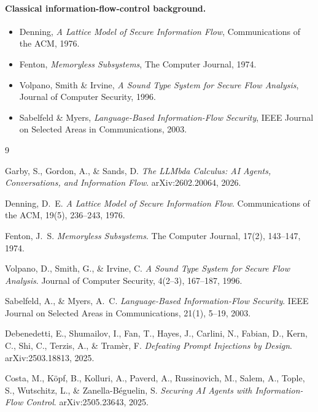 \documentclass[11pt, a4paper]{article}
\begin{document}
\begin{descirption}
{\paragraph{Classical information-flow-control background.}
\begin{itemize}
  \item Denning, \emph{A Lattice Model of Secure Information Flow},
    Communications of the ACM, 1976.
  \item Fenton, \emph{Memoryless Subsystems}, The Computer Journal, 1974.
  \item Volpano, Smith \& Irvine, \emph{A Sound Type System for Secure
    Flow Analysis}, Journal of Computer Security, 1996.
  \item Sabelfeld \& Myers, \emph{Language-Based Information-Flow
    Security}, IEEE Journal on Selected Areas in Communications, 2003.
\end{itemize}

\begin{thebibliography}{9}

Garby, S., Gordon, A., \& Sands, D.
\newblock \emph{The LLMbda Calculus: AI Agents, Conversations, and
Information Flow}.
\newblock arXiv:2602.20064, 2026.

Denning, D.~E.
\newblock \emph{A Lattice Model of Secure Information Flow}.
\newblock Communications of the ACM, 19(5), 236--243, 1976.

Fenton, J.~S.
\newblock \emph{Memoryless Subsystems}.
\newblock The Computer Journal, 17(2), 143--147, 1974.

Volpano, D., Smith, G., \& Irvine, C.
\newblock \emph{A Sound Type System for Secure Flow Analysis}.
\newblock Journal of Computer Security, 4(2--3), 167--187, 1996.

Sabelfeld, A., \& Myers, A.~C.
\newblock \emph{Language-Based Information-Flow Security}.
\newblock IEEE Journal on Selected Areas in Communications, 21(1), 5--19, 2003.

Debenedetti, E., Shumailov, I., Fan, T., Hayes, J., Carlini, N., Fabian,
D., Kern, C., Shi, C., Terzis, A., \& Tram\`er, F.
\newblock \emph{Defeating Prompt Injections by Design}.
\newblock arXiv:2503.18813, 2025.

Costa, M., K\"opf, B., Kolluri, A., Paverd, A., Russinovich, M., Salem,
A., Tople, S., Wutschitz, L., \& Zanella-B\'eguelin, S.
\newblock \emph{Securing AI Agents with Information-Flow Control}.
\newblock arXiv:2505.23643, 2025.


\end{thebibliography}}
\end{descirption}
\end{document}
